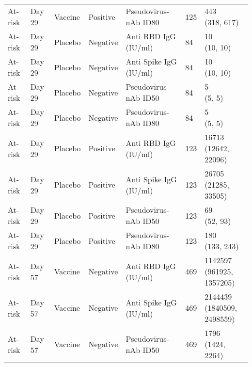\documentclass[]{book}
\theoremstyle{definition}
\theoremstyle{definition}
\theoremstyle{definition}
\newcommand{\1}{\mathbbm{1}}
\begin{document}
\begin{landscape}
\begin{ThreePartTable}
\begin{longtable}[t]{>{\raggedright\arraybackslash}p{7cm}llllll}
\hspace{1em}At-risk & Day 29 & Vaccine & Positive & Pseudovirus-nAb ID80 & 125 & \makecell[l]{443\\(318, 617)}\\
\hspace{1em}At-risk & Day 29 & Placebo & Negative & Anti RBD IgG (IU/ml) & 84 & \makecell[l]{10\\(10, 10)}\\
\hspace{1em}At-risk & Day 29 & Placebo & Negative & Anti Spike IgG (IU/ml) & 84 & \makecell[l]{10\\(10, 10)}\\
\hspace{1em}At-risk & Day 29 & Placebo & Negative & Pseudovirus-nAb ID50 & 84 & \makecell[l]{5\\(5, 5)}\\
\hspace{1em}At-risk & Day 29 & Placebo & Negative & Pseudovirus-nAb ID80 & 84 & \makecell[l]{5\\(5, 5)}\\
\hspace{1em}At-risk & Day 29 & Placebo & Positive & Anti RBD IgG (IU/ml) & 123 & \makecell[l]{16713\\(12642, 22096)}\\
\hspace{1em}At-risk & Day 29 & Placebo & Positive & Anti Spike IgG (IU/ml) & 123 & \makecell[l]{26705\\(21285, 33505)}\\
\hspace{1em}At-risk & Day 29 & Placebo & Positive & Pseudovirus-nAb ID50 & 123 & \makecell[l]{69\\(52, 93)}\\
\hspace{1em}At-risk & Day 29 & Placebo & Positive & Pseudovirus-nAb ID80 & 123 & \makecell[l]{180\\(133, 243)}\\
\hspace{1em}At-risk & Day 57 & Vaccine & Negative & Anti RBD IgG (IU/ml) & 469 & \makecell[l]{1142597\\(961925, 1357205)}\\
\hspace{1em}At-risk & Day 57 & Vaccine & Negative & Anti Spike IgG (IU/ml) & 469 & \makecell[l]{2144439\\(1840509, 2498559)}\\
\hspace{1em}At-risk & Day 57 & Vaccine & Negative & Pseudovirus-nAb ID50 & 469 & \makecell[l]{1796\\(1424, 2264)}\\

\end{longtable}
\end{ThreePartTable}
\end{landscape}
\end{document}
